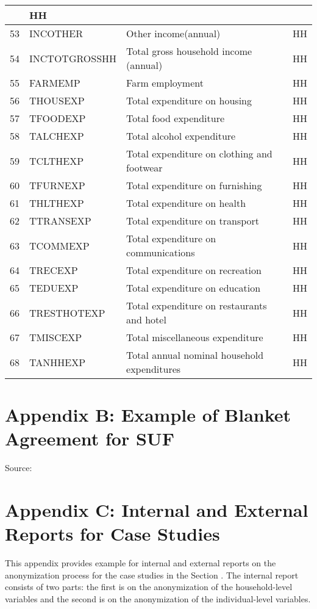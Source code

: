 \documentclass[letterpaper,10pt,english]{sphinxmanual}
\begin{document}
\begin{savenotes}
\begin{longtable}[c]{|l|l|l|l|}
&
HH
\\
\hline
53
&
INCOTHER
&
Other
income(annual)
&
HH
\\
\hline
54
&
INCTOTGROSSHH
&
Total gross
household
income (annual)
&
HH
\\
\hline
55
&
FARMEMP
&
Farm employment
&
HH
\\
\hline
56
&
THOUSEXP
&
Total
expenditure on
housing
&
HH
\\
\hline
57
&
TFOODEXP
&
Total food
expenditure
&
HH
\\
\hline
58
&
TALCHEXP
&
Total alcohol
expenditure
&
HH
\\
\hline
59
&
TCLTHEXP
&
Total
expenditure on
clothing and
footwear
&
HH
\\
\hline
60
&
TFURNEXP
&
Total
expenditure on
furnishing
&
HH
\\
\hline
61
&
THLTHEXP
&
Total
expenditure on
health
&
HH
\\
\hline
62
&
TTRANSEXP
&
Total
expenditure on
transport
&
HH
\\
\hline
63
&
TCOMMEXP
&
Total
expenditure on
communications
&
HH
\\
\hline
64
&
TRECEXP
&
Total
expenditure on
recreation
&
HH
\\
\hline
65
&
TEDUEXP
&
Total
expenditure on
education
&
HH
\\
\hline
66
&
TRESTHOTEXP
&
Total
expenditure on
restaurants and
hotel
&
HH
\\
\hline
67
&
TMISCEXP
&
Total
miscellaneous
expenditure
&
HH
\\
\hline
68
&
TANHHEXP
&
Total annual
nominal
household
expenditures
&
HH
\\
\hline
\end{longtable}\sphinxatlongtableend\end{savenotes}


\section{Appendix B: Example of Blanket Agreement for SUF}
\label{\detokenize{appendices:appendix-b-example-of-blanket-agreement-for-suf}}
\begin{figure}[htbp]
\centering

\noindent{}
\end{figure}

Source: {\hyperref[\detokenize{appendices:dubo10}]{}}


\section{Appendix C: Internal and External Reports for Case Studies}
\label{\detokenize{appendices:appendix-c-internal-and-external-reports-for-case-studies}}
This appendix provides example for internal and external reports on the
anonymization process for the case studies in the Section
. The internal
report consists of two parts: the first is on the anonymization of the
household-level variables and the second is on the anonymization of the
individual-level variables.
\end{document}
